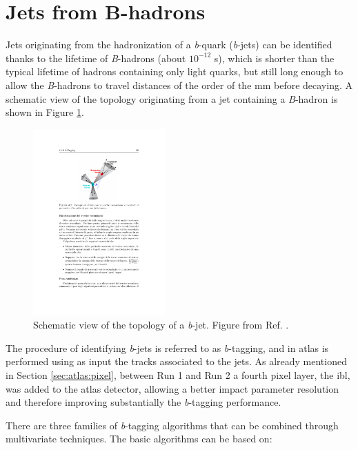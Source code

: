 \section{Jets from B-hadrons}
\label{sec:btagging}

Jets originating from the hadronization of a \textit{b}-quark (\textit{b}-jets) can be identified thanks to the lifetime of \textit{B}-hadrons (about $10^{-12}$ s), which is shorter than the typical lifetime of hadrons containing only light quarks, but still long enough to allow the \textit{B}-hadrons to travel distances of the order of the mm before decaying. A schematic view of the topology originating from a jet containing a \textit{B}-hadron is shown in Figure \ref{fig:btag}. 
\begin{figure}[h]
\begin{center}
\includegraphics[width=0.45\textwidth]{./figures/objects/secvtx.pdf}
\end{center}
\caption[Schematic view of the topology of a \textit{b}-jet.]{Schematic view of the topology of a \textit{b}-jet. Figure from Ref. \cite{d0btagging}.}
\label{fig:btag}
\end{figure}
The procedure of identifying \textit{b}-jets is referred to as \textit{b}-tagging, and in \gls{atlas} is performed using as input the tracks associated to the jets. As already mentioned in Section \ref{sec:atlas:pixel}, between Run 1 and Run 2 a fourth pixel layer, the \gls{ibl}, was added to the \gls{atlas} detector, allowing a better impact parameter resolution and therefore improving substantially the \textit{b}-tagging performance. 

There are three families of \textit{b}-tagging algorithms that can be combined through multivariate techniques. The basic algorithms can be based on:

